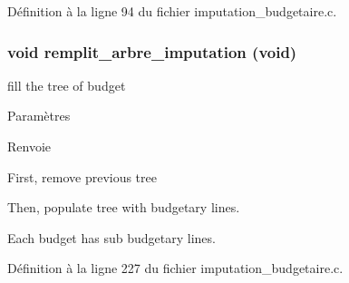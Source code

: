 Définition à la ligne 94 du fichier imputation\_\-budgetaire.c.

\subsubsection[{remplit\_\-arbre\_\-imputation}]{\setlength{\rightskip}{0pt plus 5cm}void remplit\_\-arbre\_\-imputation (void)}\label{imputation__budgetaire_8h_a3c4c67e80fdca7661b83a5176e7ac787}
fill the tree of budget


\begin{DoxyParams}{Paramètres}
\item[{\em }]\end{DoxyParams}
\begin{DoxyReturn}{Renvoie}

\end{DoxyReturn}


First, remove previous tree

Then, populate tree with budgetary lines.

Each budget has sub budgetary lines. 



Définition à la ligne 227 du fichier imputation\_\-budgetaire.c.

